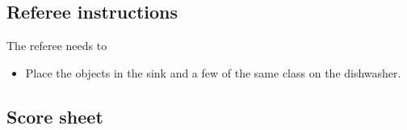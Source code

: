 \subsection{Referee instructions}
The referee needs to
\begin{itemize}
	\item Place the objects in the sink and a few of the same class on the dishwasher. 
\end{itemize}


\newpage
\subsection{Score sheet}



